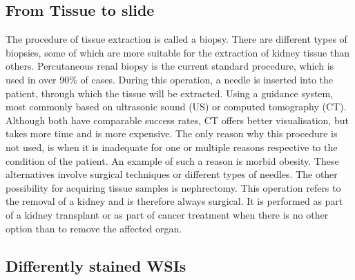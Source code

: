 \subsection{From Tissue to slide}

The procedure of tissue extraction is called a biopsy. There are different types of biopsies, some of which are more suitable for the extraction of kidney tissue than others. Percutaneous renal biopsy is the current standard procedure, which is used in over 90\% of cases. During this operation, a needle is inserted into the patient, through which the tissue will be extracted. Using a guidance system, most commonly based on ultrasonic sound (US) or computed tomography (CT). Although both have comparable success rates, CT offers better visualisation, but takes more time and is more expensive.
The only reason why this procedure is not used, is when it is inadequate for one or multiple reasons respective to the condition of the patient. An example of such a reason is morbid obesity. These alternatives involve surgical techniques or different types of needles. \cite{Zhuo2017Alternative}
The other possibility for acquiring tissue samples is nephrectomy. This operation refers to the removal of a kidney and is therefore always surgical. It is performed as part of a kidney transplant or as part of cancer treatment when there is no other option than to remove the affected organ.
\cite{Herr2008Surgical}

\subsection{Differently stained WSIs}

